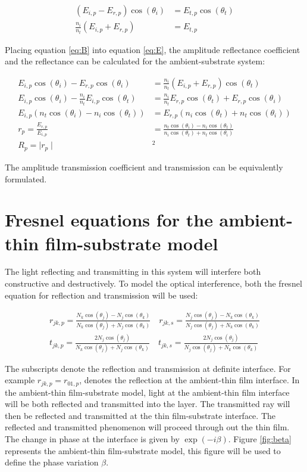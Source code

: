 \documentclass[MasterThesisMain.tex]{subfiles}
\begin{document}
\begin{align}
(E_{i,p}-E_{r,p})\cos(\theta_i) &= E_{t,p}\cos(\theta_t) \label{eq:E}\\
\frac{n_i}{n_t}(E_{i,p}+E_{r,p}) &= E_{t,p} \label{eq:B}
\end{align}

Placing equation \ref{eq:B} into equation \ref{eq:E}, the amplitude reflectance coefficient and the reflectance can be calculated for the ambient-substrate system:

\begin{align}
E_{i,p}\cos(\theta_i)-E_{r,p}\cos(\theta_i) &= \frac{n_i}{n_t}(E_{i,p}+E_{r,p}) \cos(\theta_t) \\
E_{i,p}\cos(\theta_i) - \frac{n_i}{n_t}E_{i,p} \cos(\theta_t) &= \frac{n_i}{n_t}E_{r,p} \cos(\theta_t) + E_{r,p} \cos(\theta_i)\\
E_{i,p}(n_t\cos(\theta_i)-n_i\cos(\theta_t)) &= E_{r,p}(n_i\cos(\theta_t)+n_t\cos(\theta_i))\\
r_p = \frac{E_{r,p}}{E_{i,p}} &= \frac{n_t\cos(\theta_i)-n_i\cos(\theta_t)}{n_i\cos(\theta_t)+n_t\cos(\theta_i)} \label{eq:a-srefl}\\
R_p = \mid r_p \mid &^2 
\end{align}

The amplitude transmission coefficient and transmission can be equivalently formulated. 

\section{Fresnel equations for the ambient-thin film-substrate model}
The light reflecting and transmitting in this system will interfere both constructive and destructively. To model the optical interference, both the fresnel equation for reflection and transmission will be used:

\begin{align}
r_{jk,p} = \frac{N_k\cos(\theta_j)-N_j\cos(\theta_k)}{N_k\cos(\theta_j)+N_j\cos(\theta_k)} \quad r_{jk,s} = \frac{N_j\cos(\theta_j)-N_k\cos(\theta_k)}{N_j\cos(\theta_j)+N_k\cos(\theta_k)} \\
t_{jk,p} = \frac{2N_j\cos(\theta_j)}{N_k\cos(\theta_j)+N_j\cos(\theta_k)} \quad t_{jk,s} = \frac{2N_j\cos(\theta_j)}{N_j\cos(\theta_j)+N_k\cos(\theta_k)} 
\end{align}

The subscripts denote the reflection and transmission at definite interface. For example $r_{jk,p} = r_{01,p}$, denotes the reflection at the ambient-thin film interface. In the ambient-thin film-substrate model, light at the ambient-thin film interface will be both reflected and transmitted into the layer. The transmitted ray will then be reflected and transmitted at the thin film-substrate interface. The reflected and transmitted phenomenon will proceed through out the thin film. The change in phase at the interface is given by $\exp(-i\beta)$. Figure \ref{fig:beta} represents the ambient-thin film-substrate model, this figure will be used to define the phase variation $\beta$.
\end{document}
